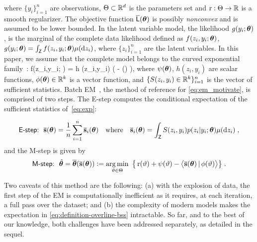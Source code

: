 \documentclass[11pt]{article}
\theoremstyle{t}
\begin{document}
\vspace{-0.15in}
where $\{y_i\}_{i=1}^n$ are observations, $\Param \subset \rset^d$ is the parameters set and $\Pen : \Param \rightarrow \rset$ is a smooth regularizer.
The objective function $ \overline{\calL} ( \param )$ is possibly \emph{nonconvex} and is assumed to be lower bounded. 
In the latent variable model, the likelihood $g(y_i ; \param)$, is the marginal of the complete data likelihood defined as $f(z_i,y_i; \param)$, \ie\ $g(y_i; \param) = \int_{\Zset} f (z_i,y_i;\param) \mu(\rmd z_i)$, where $\{ z_i \}_{i=1}^n$ are the latent variables.
In this paper, we assume that the complete model belongs to the curved exponential family~\citep{efron1975defining}:
\beq \label{eq:exp}
f(z_i,y_i; \param) = h  (z_i,y_i) \exp \big(  - \psi(\param) \big)\eqs,
\eeq
where $\psi(\param)$, $h(z_i,y_i)$ are scalar functions, $\phi(\param) \in \rset^k$ is a vector function, and $\{S(z_i,y_i) \in \rset^k\}_{i=1}^n$ is the vector of sufficient statistics.
Batch EM~\citep{dempster1977Maximum, wu1983convergence}, the method of reference for \eqref{eq:em_motivate}, is comprised of two steps. 
The \textsf{E-step} computes the conditional expectation of the sufficient statistics of~\eqref{eq:exp}: \vspace{-0.1in}

\vspace{-0.05in}
\begin{align}\label{eq:definition-overline-bss}
\textsf{E-step:}~~\overline{\bss}(\param)= \frac{1}{n} \sum_{i=1}^n \overline{\bss}_i(\param) \quad  \text{where}  \quad \overline{\bss}_i(\param)= \int_{\Zset} S(z_i,y_i) p(z_i|y_i;\param) \mu(\rmd z_i) \eqsp,
\end{align}
and the \textsf{M-step} is given by
\begin{align}\label{eq:mstep}
\textsf{M-step:}~~\hat{\param} = \overline{\param}( \overline{\bss}(\param) ) \eqdef \argmin_{ \vartheta \in \Param } ~\big\{ \Pen( \vartheta ) + \psi( \vartheta) - \pscal{ \overline{\bss}(\param)}{ \phi ( \vartheta) } \big\} \eqsp.
\end{align}

\vspace{-0.15in}
Two caveats of this method are the following: {\sf(a)} with the explosion of data, the first step of the EM is computationally inefficient as it requires, at each iteration, a full pass over the dataset; and {\sf(b)} the complexity of modern models makes the expectation in \eqref{eq:definition-overline-bss} intractable. 
So far, and to the best of our knowledge, both challenges have been addressed separately, as detailed in the sequel.
\end{document}
